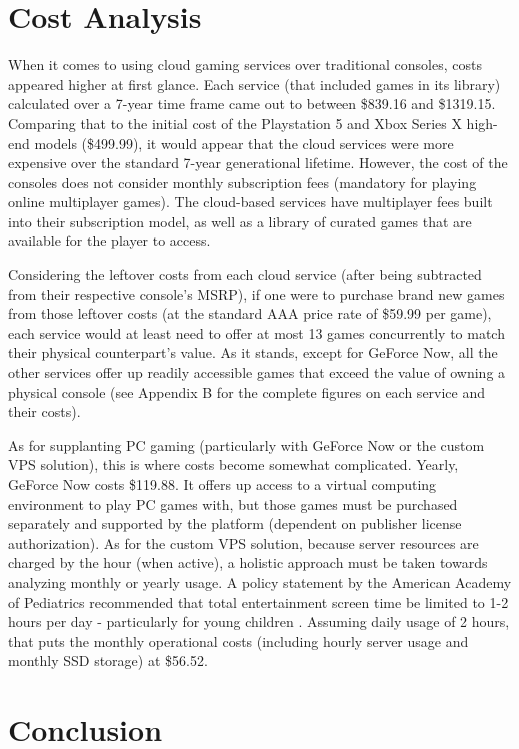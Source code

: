\documentclass[titlepage, 12pt]{article}
\begin{document}
\section{Cost Analysis}

When it comes to using cloud gaming services over traditional consoles, costs appeared higher at first glance. Each service (that included games in its library) calculated over a 7-year time frame came out to between \$839.16 and \$1319.15. Comparing that to the initial cost of the Playstation 5 and Xbox Series X high-end models (\$499.99), it would appear that the cloud services were more expensive over the standard 7-year generational lifetime. However, the cost of the consoles does not consider monthly subscription fees (mandatory for playing online multiplayer games). The cloud-based services have multiplayer fees built into their subscription model, as well as a library of curated games that are available for the player to access.

Considering the leftover costs from each cloud service (after being subtracted from their respective console’s MSRP), if one were to purchase brand new games from those leftover costs (at the standard AAA price rate of \$59.99 per game), each service would at least need to offer at most 13 games concurrently to match their physical counterpart's value. As it stands, except for GeForce Now, all the other services offer up readily accessible games that exceed the value of owning a physical console (see Appendix B for the complete figures on each service and their costs).

As for supplanting PC gaming (particularly with GeForce Now or the custom VPS solution), this is where costs become somewhat complicated. Yearly, GeForce Now costs \$119.88. It offers up access to a virtual computing environment to play PC games with, but those games must be purchased separately and supported by the platform (dependent on publisher license authorization). As for the custom VPS solution, because server resources are charged by the hour (when active), a holistic approach must be taken towards analyzing monthly or yearly usage. A policy statement by the American Academy of Pediatrics recommended that total entertainment screen time be limited to 1-2 hours per day - particularly for young children \citep{pediatrics}. Assuming daily usage of 2 hours, that puts the monthly operational costs (including hourly server usage and monthly SSD storage) at \$56.52.

\section{Conclusion}
\end{document}
